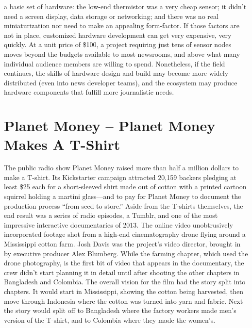 \begin{itemize}
a basic set of hardware: the low-end thermistor was a very cheap
sensor; it didn't need a screen display, data storage or networking;
and there was no real miniaturization nor need to make an appealing
form-factor. If those factors are not in place, customized hardware
development can get very expensive, very quickly. At a unit price of
\$100, a project requiring just tens of sensor nodes moves beyond the
budgets available to most newsrooms, and above what many individual
audience members are willing to spend. Nonetheless, if the
field continues, the skills of hardware design and build may become
more widely distributed (even into news developer teams), and the
ecosystem may produce hardware components that fulfill more
journalistic needs.
\end{itemize}

\section{Planet Money – Planet Money Makes A T-Shirt}
The public radio show Planet Money raised more than half a million dollars
to make a T-shirt. Its Kickstarter campaign attracted 20,159 backers
pledging at least \$25 each for a short-sleeved shirt made out of cotton with
a printed cartoon squirrel holding a martini glass—and to pay for Planet
Money to document the production process ``from seed to store.''
Aside from the T-shirts themselves, the end result was a series of radio
episodes, a Tumblr, and one of the most impressive interactive documentaries
of 2013. The online video unobtrusively incorporated footage shot
from a high-end cinematography drone flying around a Mississippi cotton
farm. Josh Davis was the project's video director, brought in by executive
producer Alex Blumberg.
While the farming chapter, which used the drone photography, is the first
bit of video that appears in the documentary, the crew didn't start planning
it in detail until after shooting the other chapters in Bangladesh and Colombia.
The overall vision for the film had the story split into chapters. It would
start in Mississippi, showing the cotton being harvested, then move through
Indonesia where the cotton was turned into yarn and fabric. Next the story
would split off to Bangladesh where the factory workers made men's version
of the T-shirt, and to Colombia where they made the women's.

